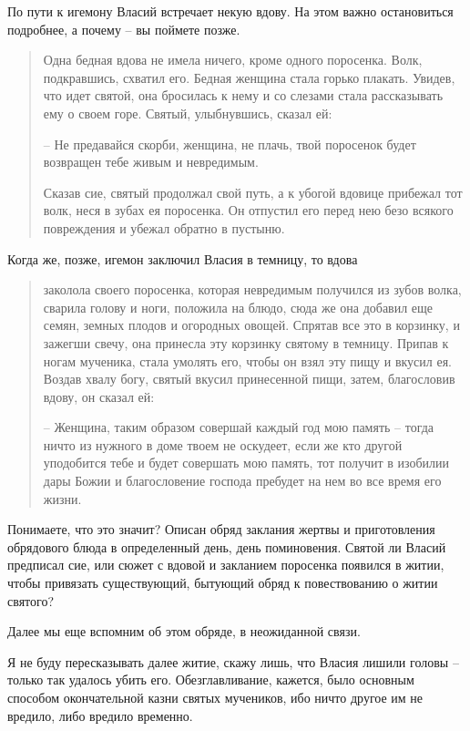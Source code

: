   По пути к игемону Власий встречает некую вдову. На этом важно остановиться подробнее, а почему – вы поймете позже.

\begin{quotation}
Одна бедная вдова не имела ничего, кроме одного поросенка. Волк, подкравшись, схватил его. Бедная женщина стала горько плакать. Увидев, что идет святой, она бросилась к нему и со слезами стала рассказывать ему о своем горе. Святый, улыбнувшись, сказал ей:

 – Не предавайся скорби, женщина, не плачь, твой поросенок будет возвращен тебе живым и невредимым.

   Сказав сие, святый продолжал свой путь, а к убогой вдовице прибежал тот волк, неся в зубах ея поросенка. Он отпустил его перед нею безо всякого повреждения и убежал обратно в пустыню.
\end{quotation}

Когда же, позже, игемон заключил Власия в темницу, то вдова

\begin{quotation}
заколола своего поросенка, которая невредимым получился из зубов волка, сварила голову и ноги, положила на блюдо, сюда же она добавил еще семян, земных плодов и огородных овощей. Спрятав все это в корзинку, и зажегши свечу, она принесла эту корзинку святому в темницу. Припав к ногам мученика, стала умолять его, чтобы он взял эту пищу и вкусил ея. Воздав хвалу богу, святый вкусил принесенной пищи, затем, благословив вдову, он сказал ей:

 – Женщина, таким образом совершай каждый год мою память – тогда ничто из нужного в доме твоем не оскудеет, если же кто другой уподобится тебе и будет совершать мою память, тот получит в изобилии дары Божии и благословение господа пребудет на нем во все время его жизни.
\end{quotation}

   Понимаете, что это значит? Описан обряд заклания жертвы и приготовления обрядового блюда в определенный день, день поминовения. Святой ли Власий предписал сие, или сюжет с вдовой и закланием поросенка появился в житии, чтобы привязать существующий, бытующий обряд к повествованию о житии святого?

   Далее мы еще вспомним об этом обряде, в неожиданной связи.

   Я не буду пересказывать далее житие, скажу лишь, что Власия лишили головы – только так удалось убить его. Обезглавливание, кажется, было основным способом окончательной казни святых мучеников, ибо ничто другое им не вредило, либо вредило временно.

